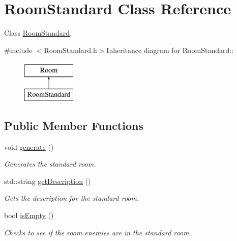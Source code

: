 \hypertarget{classRoomStandard}{
\section{RoomStandard Class Reference}
\label{classRoomStandard}
}


Class \hyperlink{classRoomStandard}{RoomStandard}.  


{\ttfamily \#include $<$RoomStandard.h$>$}Inheritance diagram for RoomStandard::\begin{figure}[H]
\begin{center}
\leavevmode
\includegraphics[height=2cm]{classRoomStandard}
\end{center}
\end{figure}
\subsection*{Public Member Functions}
\begin{DoxyCompactItemize}
\item 
void \hyperlink{classRoomStandard_ae4b216dd6c57cc03dee20e1fd81c1180}{generate} ()
\begin{DoxyCompactList}\small\item\em Generates the standard room. \item\end{DoxyCompactList}\item 
std::string \hyperlink{classRoomStandard_af1f9146a7d38e33b3f546f41ea632e9b}{getDescription} ()
\begin{DoxyCompactList}\small\item\em Gets the description for the standard room. \item\end{DoxyCompactList}\item 
bool \hyperlink{classRoomStandard_a5a9c448abac066bd2fe69e5b1d20d4e8}{isEmpty} ()
\begin{DoxyCompactList}\small\item\em Checks to see if the room enemies are in the standard room. \item\end{DoxyCompactList}\end{DoxyCompactItemize}


